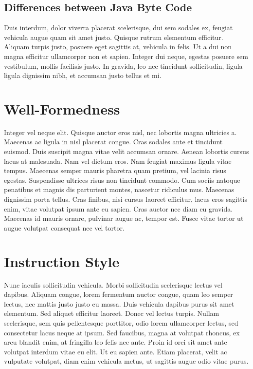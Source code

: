 \subsection{Differences between Java Byte Code}
Duis interdum, dolor viverra placerat scelerisque, dui sem sodales ex, feugiat vehicula augue quam sit amet justo. Quisque rutrum elementum efficitur. Aliquam turpis justo, posuere eget sagittis at, vehicula in felis. Ut a dui non magna efficitur ullamcorper non et sapien. Integer dui neque, egestas posuere sem vestibulum, mollis facilisis justo. In gravida, leo nec tincidunt sollicitudin, ligula ligula dignissim nibh, et accumsan justo tellus et mi.

\section{Well-Formedness}
Integer vel neque elit. Quisque auctor eros nisl, nec lobortis magna ultricies a. Maecenas ac ligula in nisl placerat congue. Cras sodales ante et tincidunt euismod. Duis suscipit magna vitae velit accumsan ornare. Aenean lobortis cursus lacus at malesuada. Nam vel dictum eros. Nam feugiat maximus ligula vitae tempus. Maecenas semper mauris pharetra quam pretium, vel lacinia risus egestas. Suspendisse ultrices risus non tincidunt commodo. Cum sociis natoque penatibus et magnis dis parturient montes, nascetur ridiculus mus. Maecenas dignissim porta tellus. Cras finibus, nisi cursus laoreet efficitur, lacus eros sagittis enim, vitae volutpat ipsum ante eu sapien. Cras auctor nec diam eu gravida. Maecenas id mauris ornare, pulvinar augue ac, tempor est. Fusce vitae tortor ut augue volutpat consequat nec vel tortor.

\section{Instruction Style}
Nunc iaculis sollicitudin vehicula. Morbi sollicitudin scelerisque lectus vel dapibus. Aliquam congue, lorem fermentum auctor congue, quam leo semper lectus, nec mattis justo justo eu massa. Duis vehicula dapibus purus sit amet elementum. Sed aliquet efficitur laoreet. Donec vel lectus turpis. Nullam scelerisque, sem quis pellentesque porttitor, odio lorem ullamcorper lectus, sed consectetur lacus neque at ipsum. Sed faucibus, magna at volutpat rhoncus, ex arcu blandit enim, at fringilla leo felis nec ante. Proin id orci sit amet ante volutpat interdum vitae eu elit. Ut eu sapien ante. Etiam placerat, velit ac vulputate volutpat, diam enim vehicula metus, ut sagittis augue odio vitae purus.

